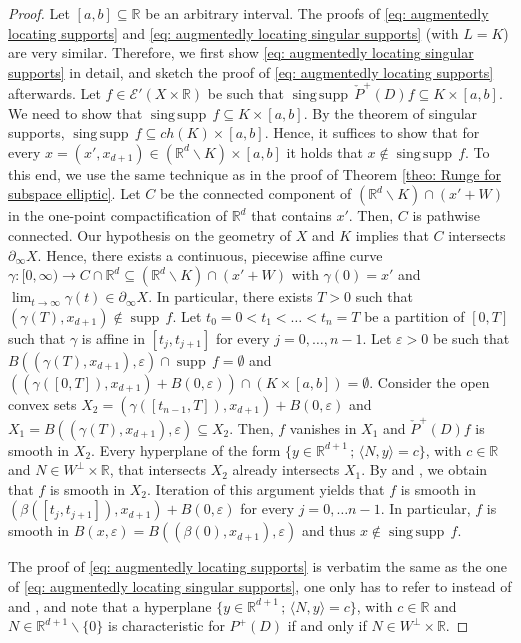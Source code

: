 \documentclass[12pt]{amsart}
\newcommand{\R}{\mathbb{R}}
\newcommand{\supp}{\operatorname{supp}\,}
\newcommand{\singsupp}{\operatorname{sing\,supp}\,}
\theoremstyle{definition}
\theoremstyle{remark}
\numberwithin{equation}{section}
\begin{document}
\begin{proof}Let $[a,b] \subseteq \R$ be an arbitrary interval.
The proofs of \eqref{eq: augmentedly locating supports} and \eqref{eq: augmentedly locating singular supports} (with $L = K$) are very similar. Therefore, we first show \eqref{eq: augmentedly locating singular supports} in detail, and sketch the proof of \eqref{eq: augmentedly locating supports} afterwards.  Let  $f \in\mathscr{E}'(X\times\R)$ be such that $\singsupp \check{P}^+(D)f \subseteq K\times[a,b]$. We need to show that  $\singsupp f \subseteq K\times[a,b]$. By the theorem of singular supports, $\singsupp f \subseteq ch(K)\times[a,b]$. Hence, it suffices to show that for  every  $x=(x',x_{d+1})\in(\R^d\backslash K) \times[a,b]$ it holds that $x \notin \singsupp f$. To this end, we use the same technique as in the proof of Theorem \ref{theo: Runge for subspace elliptic}.   Let $C$ be the connected component of $(\R^d\backslash K)\cap (x'+W)$ in the one-point compactification of $\R^d$ that contains $x'$. Then, $C$ is pathwise connected. Our hypothesis on the geometry of $X$ and $K$ implies that $C$ intersects $\partial_\infty X$. Hence, there exists a continuous, piecewise affine curve $\gamma:[0,\infty)\rightarrow C \cap \R^d \subseteq  (\R^d \backslash K) \cap (x' +W)$ with $\gamma(0)=x'$ and $\lim_{t\rightarrow\infty} \gamma(t) \in \partial_\infty X$. In particular, there exists $T >0$ such that $(\gamma(T),x_{d+1})\notin\supp f$.  Let $t_0=0<t_1<\ldots<t_n=T$ be a partition of $[0,T]$ such that $\gamma$ is affine in $[t_j,t_{j+1}]$ for every $j=0,\ldots,n-1$.
Let $\varepsilon>0$ be such that $B((\gamma(T),x_{d+1}),\varepsilon) \cap \supp f = \emptyset$  and $\left((\gamma ([0,T]),x_{d+1})+B(0,\varepsilon)\right) \cap \left(K \times [a,b]\right) = \emptyset$.  Consider the open convex sets $X_2 = (\gamma ([t_{n-1},T]),x_{d+1})+B(0,\varepsilon)$ and $X_1=B((\gamma (T),x_{d+1}), \varepsilon) \subseteq X_2$. Then, $f$ vanishes in  $X_1$ and $ \check{P}^+(D)f$ is smooth in $X_2$. Every hyperplane  of the form $ \{y\in\R^{d+1}\, ; \,\langle N, y \rangle =c \}$, with $c \in \R$ and $N \in W^\perp \times \R$, that intersects $X_2$ already intersects $X_1$. By \cite[Corollary 11.3.7]{HoermanderPDO2} and  \cite[Lemma 8]{Kalmes19}, we obtain that $f$ is smooth in $X_2$. Iteration of this argument yields that $f$ is smooth in $(\beta([t_j,t_{j+1}]),x_{d+1})+B(0,\varepsilon)$ for every $j=0,\ldots n-1$. In particular, $f$ is smooth in $B(x,\varepsilon) = B((\beta(0),x_{d+1}),\varepsilon)$ and thus $x\notin \singsupp f$.

The proof of  \eqref{eq: augmentedly locating supports}  is verbatim the same as the one of \eqref{eq: augmentedly locating singular supports}, one only has to refer to \cite[Theorem 8.6.8]{HoermanderPDO1} instead of \cite[Corollary 11.3.7]{HoermanderPDO2}  and  \cite[Lemma 8]{Kalmes19}, and note that a hyperplane  $\{y\in\R^{d+1}\, ; \,\langle N, y \rangle =c \}$, with $c \in \R$ and $N \in \R^{d+1}\backslash \{0\}$ is characteristic for $P^+(D)$ if and only if $N\in W^\perp\times\R$.
\end{proof}
\end{document}
